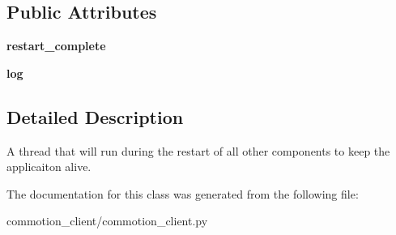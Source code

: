 \subsection*{Public Attributes}
\begin{DoxyCompactItemize}
\item 
\hypertarget{classcommotion__client_1_1commotion__client_1_1HoldStateDuringRestart_ad49b6b600ca627a0498a372f15887859}{{\bfseries restart\+\_\+complete}}\label{classcommotion__client_1_1commotion__client_1_1HoldStateDuringRestart_ad49b6b600ca627a0498a372f15887859}

\item 
\hypertarget{classcommotion__client_1_1commotion__client_1_1HoldStateDuringRestart_a999d8455148ca332ec899dfe79585423}{{\bfseries log}}\label{classcommotion__client_1_1commotion__client_1_1HoldStateDuringRestart_a999d8455148ca332ec899dfe79585423}

\end{DoxyCompactItemize}


\subsection{Detailed Description}
\begin{DoxyVerb}A thread that will run during the restart of all other components to keep the applicaiton alive.
\end{DoxyVerb}
 

The documentation for this class was generated from the following file\+:\begin{DoxyCompactItemize}
\item 
commotion\+\_\+client/commotion\+\_\+client.\+py\end{DoxyCompactItemize}
